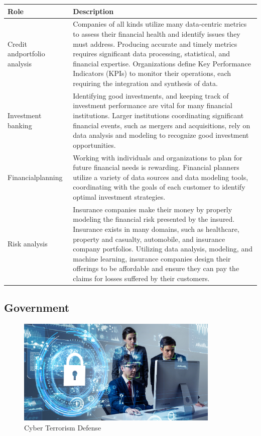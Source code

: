 \begin{table}[H]
	\begin{center}
		\begin{tabular}{p{1in}|p{3.4in}} 
			\textbf{Role} & \textbf{Description}\\
			\hline
			Credit and\linebreak portfolio analysis & Companies of all kinds utilize many data-centric metrics to assess their financial health and identify issues they must address. Producing accurate and timely metrics requires significant data processing, statistical, and financial expertise. Organizations define Key Performance Indicators (KPIs) to monitor their operations, each requiring the integration and synthesis of data.\\
			\hline
			Investment banking & Identifying good investments, and keeping track of investment performance are vital for many financial institutions. Larger institutions coordinating significant financial events, such as mergers and acquisitions, rely on data analysis and modeling to recognize good investment opportunities.\\
			\hline
			Financial\linebreak planning & Working with individuals and organizations to plan for future financial needs is rewarding. Financial planners utilize a variety of data sources and data modeling tools, coordinating with the goals of each customer to identify optimal investment strategies.\\
			\hline
			Risk analysis & Insurance companies make their money by properly modeling the financial risk presented by the insured. Insurance exists in many domains, such as healthcare, property and casualty, automobile, and insurance company portfolios. Utilizing data analysis, modeling, and machine learning, insurance companies design their offerings to be affordable and ensure they can pay the claims for losses suffered by their customers.\\
			\hline
		\end{tabular}
	\end{center}
\end{table}

\subsection{Government}

\begin{figure}[H]
	\begin{center}
		\caption{Cyber Terrorism Defense}
		\vskip 4pt
		\includegraphics[height=2in]{images/careers/iStock-1169668290.small.jpg}
	\end{center}
\end{figure}

